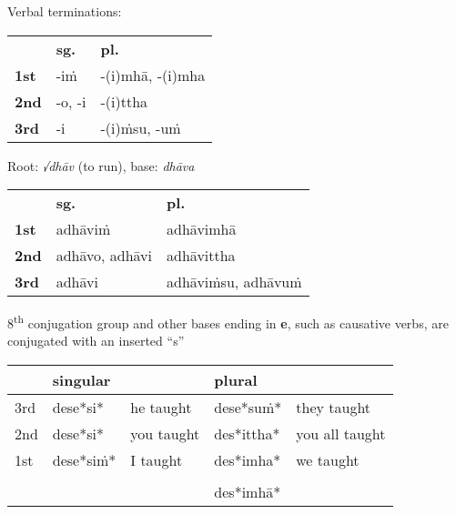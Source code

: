 \documentclass[11pt,oneside]{memoir}
\begin{document}
{\centering\par
\begin{multicols}{2}

Verbal terminations:

\begin{center}
\begin{tabular}{lll}
 & \textbf{sg.} & \textbf{pl.}\\[0pt]
\textbf{1st} & -iṁ & -(i)mhā, -(i)mha\\[0pt]
\textbf{2nd} & -o, -i & -(i)ttha\\[0pt]
\textbf{3rd} & -i & -(i)ṁsu, -uṁ\\[0pt]
\end{tabular}
\end{center}

\columnbreak

Root: \emph{√dhāv} (to run), base: \emph{dhāva}

\begin{center}
\begin{tabular}{lll}
 & \textbf{sg.} & \textbf{pl.}\\[0pt]
\textbf{1st} & adhāviṁ & adhāvimhā\\[0pt]
\textbf{2nd} & adhāvo, adhāvi & adhāvittha\\[0pt]
\textbf{3rd} & adhāvi & adhāviṁsu, adhāvuṁ\\[0pt]
\end{tabular}
\end{center}

\end{multicols}
\par}

8\textsuperscript{th} conjugation group and other bases ending in \textbf{e}, such as causative verbs, are conjugated with an inserted “s”

\begin{center}
\begin{tabular}{lllll}
 & singular &  & plural & \\[0pt]
\hline
3rd & dese*si* & he taught & dese*suṁ* & they taught\\[0pt]
2nd & dese*si* & you taught & des*ittha* & you all taught\\[0pt]
1st & dese*siṁ* & I taught & des*imha* & we taught\\[0pt]
 &  &  &  & \\[0pt]
 &  &  & des*imhā* & \\[0pt]
\end{tabular}
\end{center}
\end{document}

